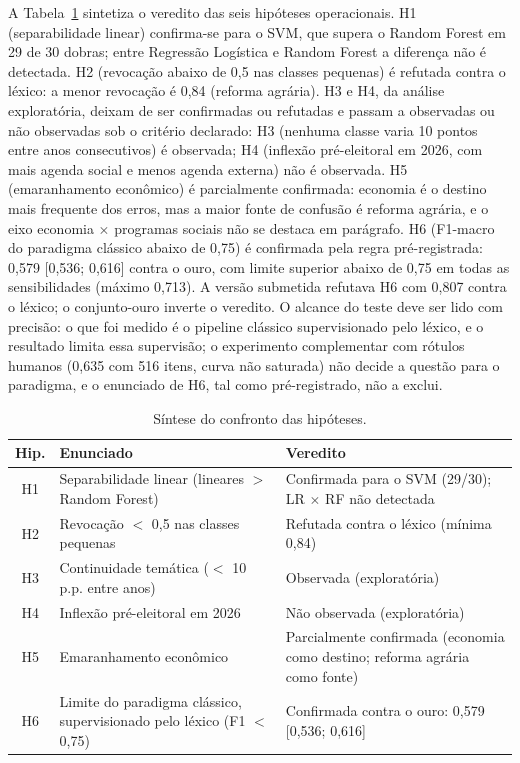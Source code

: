 \documentclass[fleqn,10pt]{SelfArx}
\begin{document}
A Tabela~\ref{tab:hipoteses} sintetiza o veredito das seis hipóteses operacionais. H1 (separabilidade linear) confirma-se para o SVM, que supera o Random Forest em 29 de 30 dobras; entre Regressão Logística e Random Forest a diferença não é detectada. H2 (revocação abaixo de 0,5 nas classes pequenas) é refutada contra o léxico: a menor revocação é 0,84 (reforma agrária). H3 e H4, da análise exploratória, deixam de ser confirmadas ou refutadas e passam a observadas ou não observadas sob o critério declarado: H3 (nenhuma classe varia 10 pontos entre anos consecutivos) é observada; H4 (inflexão pré-eleitoral em 2026, com mais agenda social e menos agenda externa) não é observada. H5 (emaranhamento econômico) é parcialmente confirmada: economia é o destino mais frequente dos erros, mas a maior fonte de confusão é reforma agrária, e o eixo economia $\times$ programas sociais não se destaca em parágrafo. H6 (F1-macro do paradigma clássico abaixo de 0,75) é confirmada pela regra pré-registrada: 0,579 [0,536; 0,616] contra o ouro, com limite superior abaixo de 0,75 em todas as sensibilidades (máximo 0,713). A versão submetida refutava H6 com 0,807 contra o léxico; o conjunto-ouro inverte o veredito. O alcance do teste deve ser lido com precisão: o que foi medido é o pipeline clássico supervisionado pelo léxico, e o resultado limita essa supervisão; o experimento complementar com rótulos humanos (0,635 com 516 itens, curva não saturada) não decide a questão para o paradigma, e o enunciado de H6, tal como pré-registrado, não a exclui.

\begin{table}[ht]
\caption{Síntese do confronto das hipóteses.}
\label{tab:hipoteses}
\centering
\small
\begin{tabular}{clp{7.2cm}}
\toprule
Hip. & Enunciado & Veredito \\
\midrule
H1 & Separabilidade linear (lineares $>$ Random Forest) & Confirmada para o SVM (29/30); LR $\times$ RF não detectada \\
H2 & Revocação $<$ 0,5 nas classes pequenas & Refutada contra o léxico (mínima 0,84) \\
H3 & Continuidade temática ($<$ 10 p.p. entre anos) & Observada (exploratória) \\
H4 & Inflexão pré-eleitoral em 2026 & Não observada (exploratória) \\
H5 & Emaranhamento econômico & Parcialmente confirmada (economia como destino; reforma agrária como fonte) \\
H6 & Limite do paradigma clássico, supervisionado pelo léxico (F1 $<$ 0,75) & Confirmada contra o ouro: 0,579 [0,536; 0,616] \\
\bottomrule
\end{tabular}
\end{table}
\end{document}
